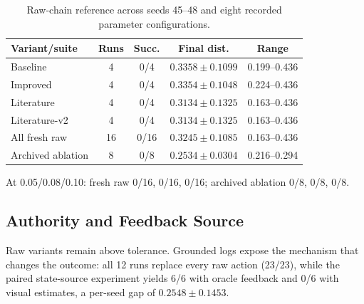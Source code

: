 \documentclass[conference]{IEEEtran}
\begin{document}
\begin{table}[!t]
\centering
\caption{Raw-chain reference across seeds 45--48 and eight recorded parameter configurations.}
\label{tab:unmodified}
\scriptsize
\setlength{\tabcolsep}{2pt}
\begin{tabular}{@{}p{}cccc@{}}
\toprule
Variant/suite & Runs & Succ. & Final dist. & Range \\
\midrule
Baseline & 4 & 0/4 & $0.3358{\pm}0.1099$ & 0.199--0.436 \\
Improved & 4 & 0/4 & $0.3354{\pm}0.1048$ & 0.224--0.436 \\
Literature & 4 & 0/4 & $0.3134{\pm}0.1325$ & 0.163--0.436 \\
Literature-v2 & 4 & 0/4 & $0.3134{\pm}0.1325$ & 0.163--0.436 \\
All fresh raw & 16 & 0/16 & $0.3245{\pm}0.1085$ & 0.163--0.436 \\
Archived ablation & 8 & 0/8 & $0.2534{\pm}0.0304$ & 0.216--0.294 \\
\bottomrule
\end{tabular}
\vspace{1pt}

\scriptsize At 0.05/0.08/0.10: fresh raw 0/16, 0/16, 0/16; archived ablation 0/8, 0/8, 0/8.
\setlength{\tabcolsep}{6pt}
\end{table}

\subsection{Authority and Feedback Source}
Raw variants remain above tolerance. Grounded logs expose the mechanism that changes the outcome: all 12 runs replace every raw action (23/23), while the paired state-source experiment yields 6/6 with oracle feedback and 0/6 with visual estimates, a per-seed gap of $0.2548\pm0.1453$.
\end{document}
